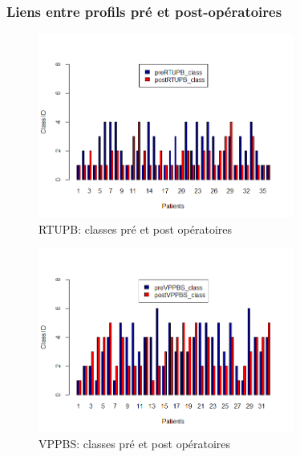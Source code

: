 %

\subsubsection{Liens entre profils pré et post-opératoires}

\begin{figure}[H]
\centering
\includegraphics[width=0.75\textwidth]{../Fig/RTUPB/rtupb-histogram-pre-post.png}
\caption{RTUPB: classes pré et post opératoires}
\label{fig-rtupb-histogram}
\end{figure}

\begin{figure}[H]
\centering
\includegraphics[width=0.75\textwidth]{../Fig/VPPBS/vppbs-histogram-pre-post.png}
\caption{VPPBS: classes pré et post opératoires}
\label{fig-vppbs-histogramFi	}
\end{figure}
